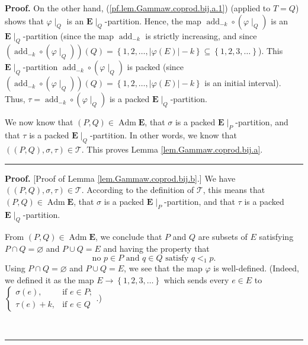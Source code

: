 \documentclass[numbers=enddot,12pt,final,onecolumn,notitlepage,abstracton]{scrartcl}
\theoremstyle{definition}
\newenvironment{proof}[1][Proof]{\noindent\textbf{#1.} }{\ \rule{0.5em}{0.5em}}
\newenvironment{verlong}{}{}
\newcommand{\Adm}{\operatorname{Adm}}
\newcommand{\EE}{{\mathbf{E}}}
\begin{document}
\begin{verlong}
\begin{proof}
On the other hand, (\ref{pf.lem.Gammaw.coprod.bij.a.1}) (applied to $T=Q$)
shows that $\varphi\mid_{Q}$ is an $\EE\mid_{Q}$-partition. Hence, the
map $\operatorname{add}_{-k}\circ\left(  \varphi\mid_{Q}\right)  $
is an $\EE\mid_{Q}$-partition (since the map
$\operatorname{add}_{-k}$ is strictly increasing, and since
$\left(  \operatorname{add}_{-k}\circ\left(  \varphi\mid_{Q}\right)
 \right)  \left(  Q\right)
=\left\{  1,2,\ldots,\left\vert \varphi\left(  E\right)  \right\vert
-k\right\}  \subseteq\left\{  1,2,3,\ldots\right\}  $). This $\EE%
\mid_{Q}$-partition $\operatorname{add}_{-k}\circ\left(  \varphi
\mid_{Q}\right)  $ is packed \newline (since
$\left(  \operatorname{add}_{-k}\circ
\left(  \varphi\mid_{Q}\right)  \right)  \left(  Q\right)
=\left\{  1,2,\ldots,\left\vert \varphi\left(  E\right)  \right\vert
-k\right\}  $ is an initial interval). Thus,
$\tau = \operatorname{add}_{-k} \circ\left(  \varphi\mid_{Q}\right)  $
is a packed $\EE\mid_{Q}$-partition.

We now know that $\left(  P,Q\right)  \in \Adm \EE$, that
$\sigma$ is a packed $\EE\mid_{P}$-partition, and that $\tau$ is a
packed $\EE\mid_{Q}$-partition. In other words, we know that $\left(
\left(  P,Q\right)  ,\sigma,\tau\right)  \in\mathcal{T}$. This proves Lemma
\ref{lem.Gammaw.coprod.bij.a}.
\end{proof}

\begin{proof}
[Proof of Lemma \ref{lem.Gammaw.coprod.bij.b}.]
We have $\left( \left( P, Q \right) , \sigma, \tau \right)
\in \mathcal{T}$. According to the definition of $\mathcal{T}$, this
means that $\left( P, Q \right) \in \Adm \EE $, that $\sigma$ is a
packed $\EE \mid_{P}$-partition, and that $\tau$ is a packed
$\EE \mid_{Q}$-partition.

From $\left(  P,Q\right)  \in \Adm \EE$, we conclude that
$P$ and $Q$ are subsets of $E$ satisfying $P\cap Q=\varnothing$ and $P\cup
Q=E$ and having the property that
\begin{equation}
\text{no }p\in P\text{ and }q\in Q\text{ satisfy }q<_{1}p.
\label{pf.lem.Gammaw.coprod.bij.b.Adm}
\end{equation}
Using $P \cap Q = \varnothing$ and $P \cup Q = E$, we see that the
map $\varphi$ is well-defined. (Indeed, we defined it as the map
$E \to \left\{1,2,3,\ldots\right\}$ which sends every $e\in E$ to $%
\begin{cases}
\sigma\left(  e\right)  , & \text{if }e\in P;\\
\tau\left(  e\right)  +k, & \text{if }e\in Q
\end{cases}
$.)


\end{proof}
\end{verlong}
\end{document}

